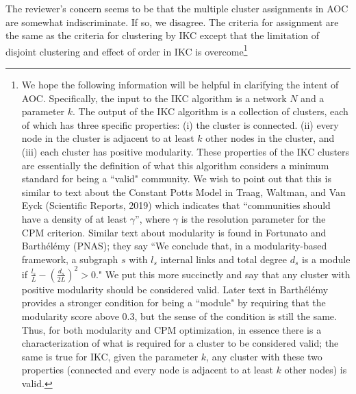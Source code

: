 \documentclass[11pt, oneside]{article}   	%
\begin{document}
\vspace{2 mm} The reviewer's concern seems to be that the multiple cluster assignments in AOC are somewhat indiscriminate. If so, we disagree. The criteria for assignment are the same as the criteria for clustering by IKC except that the limitation of disjoint clustering and effect of order in IKC is overcome\footnote{ We hope the following information will be helpful in clarifying the intent of AOC.  Specifically, the input to the IKC algorithm is a network $N$ and a parameter $k$. The output of the IKC algorithm is a collection of clusters, each of which has three specific properties: (i) the cluster is connected. (ii) every node in the cluster is adjacent to at least $k$ other nodes in the cluster, and (iii) each cluster has positive modularity. These properties of the IKC clusters are essentially the definition of what this algorithm considers  a minimum standard for being a ``valid" community.  We wish to point out that this is similar to text about the Constant Potts Model in Traag, Waltman, and Van Eyck (Scientific Reports, 2019) which indicates that ``communities should have a density of at least $\gamma$'', where $\gamma$ is the resolution parameter for the CPM criterion.  Similar text about modularity is found in Fortunato and Barth\'el\'emy (PNAS); they  say ``We conclude that, in a modularity-based framework, a subgraph $s$ with $l_s$ internal links and total degree $d_s$ is a 
module if $\frac{l_s}{L} - \left( \frac{d_s}{2L} \right) ^2 > 0$."  We put this more succinctly and say that any cluster with positive modularity should be considered valid. 
Later text in Barth\'el\'emy provides a stronger condition for being a ``module" by requiring that the modularity score above 0.3, but the sense of the condition is still the same. Thus, for both modularity and CPM optimization, in essence there is a characterization of what is required for a cluster to be considered valid; the same is true for IKC, given the parameter $k$, any cluster with these two properties (connected and every node is adjacent to at least $k$ other nodes) is valid. 

}
\end{document}
